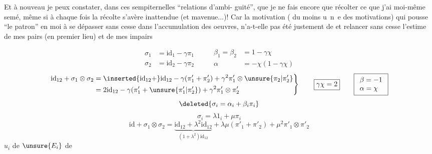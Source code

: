 Et à nouveau je peux constater, dans ces sempiternelles ``relations d'ambi-\linebreak
guité'', que je ne fais encore que récolter ce que j'ai moi-même semé, même si à
chaque fois la récolte s'avère inattendue (et mavenue...)! Car la motivation (
du moins \mbox{u n e} des motivations) qui pousse ``le patron'' en moi à se dépasser
sans cesse dans l'accumulation des oeuvres, n'a-t-elle pas été justement de 
et relancer sans cesse l'estime de mes pairs (en premier lieu) et de mes impairs

\[
\begin{aligned}
\sigma_1&=\mathrm{id}_1-\gamma\pi_1\\
\sigma_2&=\mathrm{id}_2-\gamma\pi_2
\end{aligned}
\qquad\begin{aligned}
\beta_1=\beta_2&=1-\gamma\chi\\
\alpha&=-\chi(1-\gamma\chi)
\end{aligned}
\]
\[
\left.\begin{aligned}
\mathrm{id}_{12}+\sigma_1\otimes\sigma_2
&=\inserted{\mathrm{id}_{12}+}\mathrm{id}_{12}
-\gamma(\pi'_1+\pi'_2)+\gamma^2\pi'_1\otimes\unsure{\pi_2|\pi'_2}\\
&=2\mathrm{id}_{12}-\gamma(\pi'_1+\unsure{\pi'_1|\pi'_2})
+\gamma^2\pi'_1\otimes\pi'_2
\end{aligned}\right\}
\qquad\boxed{\gamma\chi=2}\qquad
\boxed{\begin{array}{l}\beta=-1\\\alpha=\chi\end{array}}
\]
\[
\deleted{\sigma_i=\alpha_i+\beta_i\pi_i}
\]
\[
\sigma_i=\lambda 1_i+\mu\pi_i
\]
\[
\mathrm{id}+\sigma_1\otimes\sigma_2
=\underbrace{\mathrm{id}_{12}+\lambda^2\mathrm{id}_{12}}_{(1+\lambda^2)\mathrm{id}_{12}}
+\lambda\mu(\pi'_1+\pi'_2)+\mu^2\pi'_1\otimes\pi'_2
\]
\(u_i\)  de \(\unsure{E_i}\)   de
